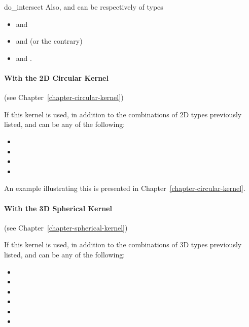 \begin{ccRefFunction}{do_intersect}
Also,  and  can be respectively of types
\begin{itemize}
\item {} and 
\item {} and  (or the contrary)
\item {} and .
\end{itemize} 

\paragraph{With the 2D Circular Kernel} (see Chapter~\ref{chapter-circular-kernel}) 


If this kernel is used, in addition to the combinations of 2D types
previously listed,  and  can be any of
the following:
\begin{itemize}
\item {}
\item {}
\item {}
\item {}
\end{itemize}

An example illustrating this is presented in
Chapter~\ref{chapter-circular-kernel}.

\paragraph{With the 3D Spherical Kernel} (see Chapter~\ref{chapter-spherical-kernel}) 


If this kernel is used, in addition to the combinations of 3D types
previously listed,  and  can be any of
the following:
\begin{itemize}
\item {}
\item {}
\item {}
\item {}
\item {}
\item {}
\end{itemize}


\end{ccRefFunction}
